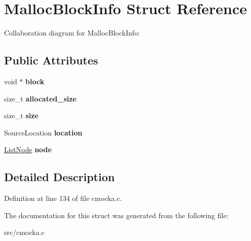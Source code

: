 \hypertarget{structMallocBlockInfo}{}\section{Malloc\+Block\+Info Struct Reference}
\label{structMallocBlockInfo}


Collaboration diagram for Malloc\+Block\+Info\+:
\subsection*{Public Attributes}
\begin{DoxyCompactItemize}
\item 
\mbox{\label{structMallocBlockInfo_aaca8b34ff6f79f4454bba197a21a52e7}} 
void $\ast$ {\bfseries block}
\item 
\mbox{\label{structMallocBlockInfo_a103783e0ba99bc5360f69c3b30a39048}} 
size\+\_\+t {\bfseries allocated\+\_\+size}
\item 
\mbox{\label{structMallocBlockInfo_a7d069f95b78b4e068752abc6277b786b}} 
size\+\_\+t {\bfseries size}
\item 
\mbox{\label{structMallocBlockInfo_af1a66bb07ef7e53441b7fca1c6c61906}} 
Source\+Location {\bfseries location}
\item 
\mbox{\label{structMallocBlockInfo_ae4628c67b78874f1569ec84bf8978b91}} 
\hyperlink{structListNode}{List\+Node} {\bfseries node}
\end{DoxyCompactItemize}


\subsection{Detailed Description}


Definition at line 134 of file cmocka.\+c.



The documentation for this struct was generated from the following file\+:\begin{DoxyCompactItemize}
\item 
src/cmocka.\+c\end{DoxyCompactItemize}
